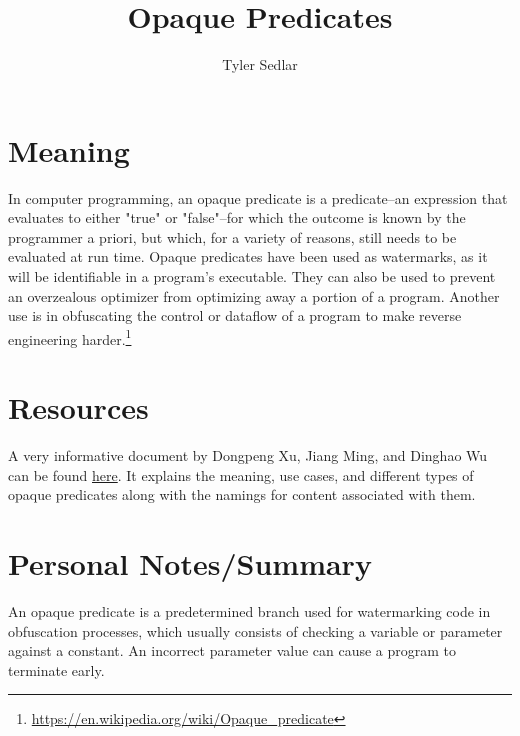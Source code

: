 \documentclass{article}
\begin{document}
\title{Opaque Predicates}
\author{Tyler Sedlar}

\maketitle

\section{Meaning}
In computer programming, an opaque predicate is a predicate--an expression that evaluates to either "true" or "false"--for which the outcome is known by the programmer a priori, but which, for a variety of reasons, still needs to be evaluated at run time. Opaque predicates have been used as watermarks, as it will be identifiable in a program's executable. They can also be used to prevent an overzealous optimizer from optimizing away a portion of a program. Another use is in obfuscating the control or dataflow of a program to make reverse engineering harder.\footnote{\url{https://en.wikipedia.org/wiki/Opaque_predicate}}

\section{Resources}

A very informative document by Dongpeng Xu, Jiang Ming, and Dinghao Wu can be found \href{https://faculty.ist.psu.edu/wu/papers/opaque-isc16.pdf}{here}. It explains the meaning, use cases, and different types of opaque predicates along with the namings for content associated with them.

\section{Personal Notes/Summary}

An opaque predicate is a predetermined branch used for watermarking code in obfuscation processes, which usually consists of checking a variable or parameter against a constant. An incorrect parameter value can cause a program to terminate early.
\end{document}
